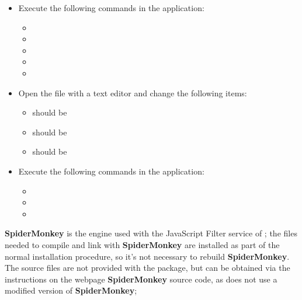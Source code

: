 \tertiaryEnd
{}
\begin{itemize}
\item Execute the following commands in the  application:
\begin{itemize}
\item {}
\item\exSp{}
\item\exSp{}
\item\exSp{}
\item\exSp{}
\end{itemize}
\item\exSp{}Open the file  with a text editor and change the
following items:
\begin{itemize}
\item {} should be 
\item\exSp{} should be 
\item\exSp{} should be 
\end{itemize}
\item\exSp{}Execute the following commands in the  application:
\begin{itemize}
\item {}
\item\exSp{}
\item\exSp{}
\end{itemize}
\end{itemize}
\tertiaryEnd
\secondaryEnd
{}
\textbf{SpiderMonkey} is the  engine used with the JavaScript Filter
service of \mplusm{}; the files needed to compile and link with \textbf{SpiderMonkey} are
installed as part of the normal \mplusm{} installation procedure, so it's not necessary to
rebuild \textbf{SpiderMonkey}.
The source files are not provided with the  package, but can be obtained
via the instructions on the web\longDash{}page
%
{\textbf{SpiderMonkey} source code}, as \mplusm{} does not use a modified version of
\textbf{SpiderMonkey};
